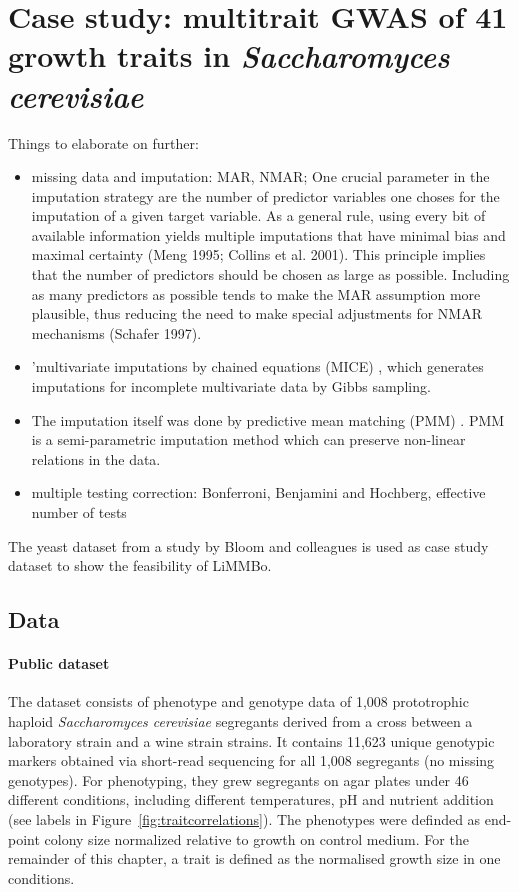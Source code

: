 \section{Case study: multitrait GWAS of 41 growth traits in \emph{Saccharomyces cerevisiae}}
Things to elaborate on further:
\begin{itemize}
\item missing data and imputation: MAR, NMAR; One crucial parameter in the imputation strategy are the number of predictor variables one choses for the imputation of a given target variable. As a general rule, using every bit of available information yields multiple imputations that have minimal bias and maximal certainty (Meng 1995; Collins et al. 2001). This principle implies that the number of predictors should be chosen as large as possible. Including as many predictors as possible tends to make the MAR assumption more plausible, thus reducing the need to make special adjustments for NMAR mechanisms (Schafer 1997).
\item 'multivariate imputations by chained equations (MICE) \citep{vanBuuren2011}, which generates imputations for incomplete multivariate data by Gibbs sampling.
\item The imputation itself was done by predictive mean matching (PMM) \citep{Little1988}. PMM is a semi-parametric imputation method which can preserve non-linear relations in the data. 
\item multiple testing correction: Bonferroni, Benjamini and Hochberg, effective number of tests
\end{itemize}
The yeast dataset from a study by Bloom and colleagues \citeyearpar{Bloom2013} is used as case study dataset to show the feasibility of LiMMBo.

\subsection{Data}
\paragraph{Public dataset} The dataset consists of phenotype and genotype data of 1,008 prototrophic haploid \emph{Saccharomyces cerevisiae} segregants derived from a cross between a laboratory strain and a wine strain strains. It contains 11,623 unique genotypic markers obtained via short-read sequencing for all 1,008 segregants (no missing genotypes). For phenotyping, they grew segregants on agar plates under 46 different conditions, including different temperatures, pH and nutrient addition (see labels in Figure~\ref{fig:traitcorrelations}). The phenotypes were definded as end-point colony size normalized relative to growth on control medium. For the remainder of this chapter, a trait is defined as the normalised growth size in one conditions.
